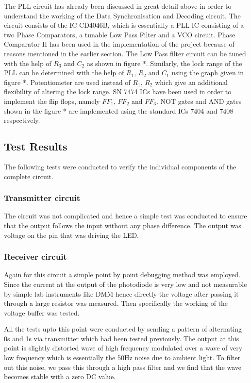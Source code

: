 \documentclass{article}
\begin{document}
The PLL circuit has already been discussed in great detail above in order to understand the working of the Data Synchronisation and Decoding circuit. The circuit consists of the IC CD4046B, which is essentially a PLL IC consisting of a two Phase Comparators, a tunable Low Pass Filter and a VCO circuit. Phase Comparator II has been used in the implementation of the project because of reasons mentioned in the earlier section. The Low Pass filter circuit can be tuned with the help of $R_3$ and $C_2$ as shown in figure *. Similarly, the lock range of the PLL can be determined with the help of $R_1$, $R_2$ and $C_1$ using the graph given in figure *. Potentiometer are used instead of $R_1$, $R_2$ which give an additional flexibility of altering the lock range. SN 7474 ICs have been used in order to implement the flip flops, namely $FF_1$, $FF_2$ and $FF_3$. NOT gates and AND gates shown in the figure * are implemented using the standard ICs 7404 and 7408 respectively. 


\subsection{Test Results}
The following tests were conducted to verify the individual components of the complete circuit.
\subsubsection{Transmitter circuit}
The circuit was not complicated and hence a simple test was conducted to ensure that the output follows the input without any phase difference. The output was voltage on the pin that was driving the LED.
\subsubsection{Receiver circuit}
Again for this circuit a simple point by point debugging method was employed. Since the current at the output of the photodiode is very low and not measurable by simple lab instruments like DMM hence directly the voltage after passing it through a large resistor was measured. Then specifically the working of the voltage buffer was tested.

All the tests upto this point were conducted by sending a pattern of alternating 0s and 1s via transmitter which had been tested previously. The output at this point is slightly distorted wave of high frequency modulated over a wave of very low frequency which is essentially the 50Hz noise due to ambient light. To filter out this noise, we pass this through a high pass filter and we find that the wave becomes stable with a zero DC value.
\end{document}
